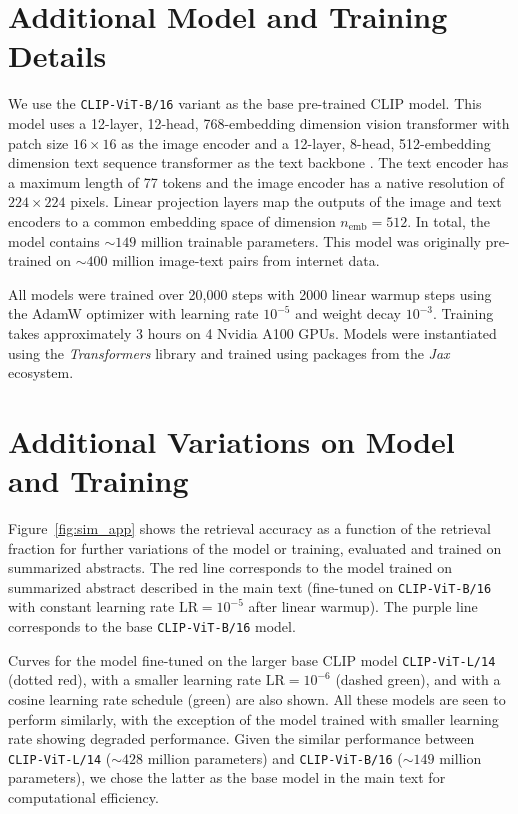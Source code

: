 \documentclass{article} %
\newcommand{\package}[1]{\textsl{#1}\xspace}
\begin{document}
\section{Additional Model and Training Details}
\label{app:model_details}

We use the \texttt{CLIP-ViT-B/16} \citep{radford2021learning} variant as the base pre-trained CLIP model.
%
This model uses a 12-layer, 12-head, 768-embedding dimension vision transformer with patch size $16\times16$ as the image encoder \citep{dosovitskiy2020image} and a 12-layer, 8-head, 512-embedding dimension text sequence transformer as the text backbone \citep{vaswani2017attention}.
%
The text encoder has a maximum length of 77 tokens and the image encoder has a native resolution of $224\times224$ pixels.
%
Linear projection layers map the outputs of the image and text encoders to a common embedding space of dimension $n_\text{emb}=512$.
%
In total, the model contains $\sim 149$ million trainable parameters.
%
This model was originally pre-trained on $\sim 400$ million image-text pairs from internet data.
%

All models were trained over 20,000 steps with 2000 linear warmup steps 
using the AdamW optimizer \citep{DBLP:conf/iclr/LoshchilovH19,DBLP:journals/corr/KingmaB14} with  %
learning rate $10^{-5}$ and weight decay $10^{-3}$.
%
Training takes approximately 3 hours on 4 Nvidia A100 GPUs.
Models were instantiated using the \package{Transformers} \citep{wolf2019huggingface} library and trained using packages from the \package{Jax} \citep{jax2018github} ecosystem.
%

\section{Additional Variations on Model and Training}
\label{app:ablations}

Figure~\ref{fig:sim_app} shows the retrieval accuracy as a function of the retrieval fraction for further variations of the model or training, evaluated and trained on summarized abstracts. The red line corresponds to the model trained on summarized abstract described in the main text (fine-tuned on \texttt{CLIP-ViT-B/16} with constant learning rate $\mathrm{LR}=10^{-5}$ after linear warmup). The purple line corresponds to the base \texttt{CLIP-ViT-B/16} model.

Curves for the model fine-tuned on the larger base CLIP model \texttt{CLIP-ViT-L/14} (dotted red), with a smaller learning rate $\mathrm{LR}=10^{-6}$ (dashed green), and with a cosine learning rate schedule (green) are also shown. All these models are seen to perform similarly, with the exception of the model trained with smaller learning rate showing degraded performance. Given the similar performance between \texttt{CLIP-ViT-L/14} ($\sim 428$ million parameters) and \texttt{CLIP-ViT-B/16} ($\sim 149$ million parameters), we chose the latter as the base model in the main text for computational efficiency.
\end{document}

